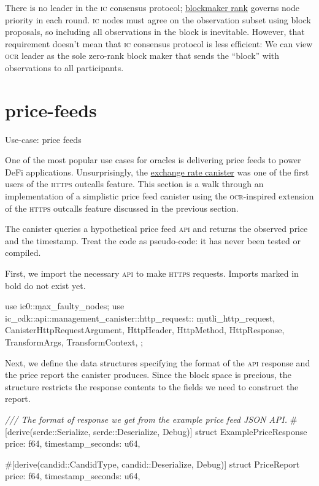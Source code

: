 \documentclass{article}
\begin{document}
There is no leader in the \textsc{ic} consensus protocol; \href{https://internetcomputer.org/how-it-works/consensus/#block-making}{blockmaker rank} governs node priority in each round.
\textsc{ic} nodes must agree on the observation subset using block proposals, so including all observations in the block is inevitable.
However, that requirement doesn't mean that \textsc{ic} consensus protocol is less efficient: We can view \textsc{ocr} leader as the sole zero-rank block maker that sends the ``block'' with observations to all participants.

\section{price-feeds}{Use-case: price feeds}

One of the most popular use cases for oracles is delivering price feeds to power DeFi applications.
Unsurprisingly, the \href{https://internetcomputer.org/docs/current/developer-docs/defi/exchange-rate-canister}{exchange rate canister} was one of the first users of the \textsc{https} outcalls feature.
This section is a walk through an implementation of a simplistic price feed canister using the \textsc{ocr}-inspired extension of the \textsc{https} outcalls feature discussed in the previous section.

The canister queries a hypothetical price feed \textsc{api} and returns the observed price and the timestamp.
Treat the code as pseudo-code: it has never been tested or compiled.

First, we import the necessary \textsc{api} to make \textsc{https} requests.
Imports marked in bold do not exist yet.

\begin{code}[rust]
use ic0::\b{max_faulty_nodes};
use ic_cdk::api::management_canister::http_request::{
    \b{mutli_http_request},
    CanisterHttpRequestArgument, HttpHeader, HttpMethod, HttpResponse, TransformArgs,
    TransformContext,
};
\end{code}

Next, we define the data structures specifying the format of the \textsc{api} response and the price report the canister produces.
Since the block space is precious, the  structure restricts the response contents to the fields we need to construct the report.

\begin{code}[rust]
\emph{/// The format of response we get from the example price feed JSON API.}
#[derive(serde::Serialize, serde::Deserialize, Debug)]
struct ExamplePriceResponse {
    price: f64,
    timestamp_seconds: u64,
}

#[derive(candid::CandidType, candid::Deserialize, Debug)]
struct PriceReport {
    price: f64,
    timestamp_seconds: u64,
}
\end{code}
\end{document}
